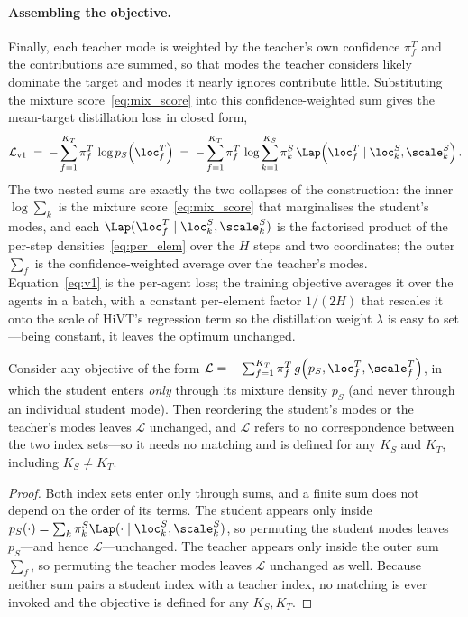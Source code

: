 \paragraph{Assembling the objective.} Finally, each teacher mode is weighted by the
teacher's own confidence $\pi^T_f$ and the contributions are summed, so that modes
the teacher considers likely dominate the target and modes it nearly ignores
contribute little. Substituting the mixture score~\eqref{eq:mix_score} into this
confidence-weighted sum gives the mean-target distillation loss in closed form,
\begin{equation}
  \label{eq:v1}
  \mathcal{L}_{\mathrm{v1}}
    \;=\; -\sum_{f=1}^{K_T} \pi^T_f \, \log p_S\!\left(\loc^T_f\right)
    \;=\; -\sum_{f=1}^{K_T} \pi^T_f \,
        \log \sum_{k=1}^{K_S} \pi^S_k \,
        \Lap\!\left(\loc^T_f \mid \loc^S_k,\scale^S_k\right).
\end{equation}
The two nested sums are exactly the two collapses of the construction: the inner
$\log\sum_k$ is the mixture score~\eqref{eq:mix_score} that marginalises the
student's modes, and each $\Lap(\loc^T_f\mid\loc^S_k,\scale^S_k)$ is the factorised
product of the per-step densities~\eqref{eq:per_elem} over the $H$ steps and two
coordinates; the outer $\sum_f$ is the confidence-weighted average over the
teacher's modes. Equation~\eqref{eq:v1} is the per-agent loss; the training
objective averages it over the agents in a batch, with a constant per-element factor
$1/(2H)$ that rescales it onto the scale of HiVT's regression term so the
distillation weight $\lambda$ is easy to set---being constant, it leaves the optimum
unchanged.
\begin{prop}
\label{prop:perm}
Consider any objective of the form
$\mathcal{L} = -\sum_{f=1}^{K_T} \pi^T_f\, g\!\left(p_S, \loc^T_f, \scale^T_f\right)$,
in which the student enters \emph{only} through its mixture density $p_S$ (and
never through an individual student mode). Then reordering the student's modes or
the teacher's modes leaves $\mathcal{L}$ unchanged, and $\mathcal{L}$ refers to no
correspondence between the two index sets---so it needs no matching and is defined
for any $K_S$ and $K_T$, including $K_S \neq K_T$.
\end{prop}
\begin{proof}
Both index sets enter only through sums, and a finite sum does not depend on the
order of its terms. The student appears only inside
$p_S(\cdot)=\sum_{k}\pi^S_k\Lap(\cdot\mid\loc^S_k,\scale^S_k)$, so permuting the
student modes leaves $p_S$---and hence $\mathcal{L}$---unchanged. The teacher
appears only inside the outer sum $\sum_f$, so permuting the teacher modes leaves
$\mathcal{L}$ unchanged as well. Because neither sum pairs a student index with a
teacher index, no matching is ever invoked and the objective is defined for any
$K_S,K_T$.
\end{proof}

